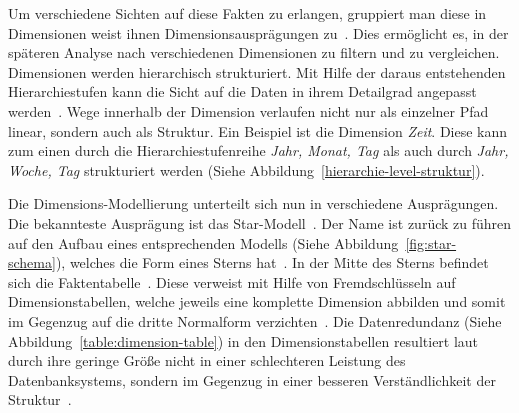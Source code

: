\documentclass[
  language=german, %
  type=bachelor%
]{isthesis}
\begin{document}
\begin{content}
  Um verschiedene Sichten auf diese Fakten zu erlangen, gruppiert man diese in
  Dimensionen \bzw{} weist ihnen Dimensionsausprägungen zu~\cite[][S.
  66]{Kemper2010}. Dies ermöglicht es, in der späteren Analyse nach
  verschiedenen Dimensionen zu filtern und zu vergleichen. Dimensionen werden
  hierarchisch strukturiert. Mit Hilfe der daraus entstehenden Hierarchiestufen
  kann die Sicht auf die Daten in ihrem Detailgrad angepasst werden~\cite[][S.
  66]{Kemper2010}. Wege innerhalb der Dimension verlaufen nicht nur als
  einzelner Pfad linear, sondern auch als Struktur. Ein Beispiel ist die
  Dimension \textit{Zeit}.  Diese kann zum einen durch die
  Hierarchiestufenreihe \textit{Jahr, Monat, Tag} als auch durch \textit{Jahr,
  Woche, Tag} strukturiert werden (Siehe
  Abbildung~\ref{hierarchie-level-struktur}).

  \begin{figure}[caption={Dimensionslevelstrukturbeispiel---Zeit}, label={hierarchie-level-struktur}]
    \resizebox{100pt}{!}{}
  \end{figure}

  Die Dimensions-Modellierung unterteilt sich nun in verschiedene Ausprägungen.
  Die bekannteste Ausprägung ist das Star-Modell~\cite[][S.
  2]{phipps2002automating}. Der Name ist zurück zu f\"uhren auf den Aufbau
  eines entsprechenden Modells (Siehe Abbildung~\ref{fig:star-schema}), welches
  die Form eines Sterns hat~\cite[][S.  44]{Kimball2013}. In der Mitte des
  Sterns befindet sich die Faktentabelle~\cite[][S. 67]{Kemper2010}. Diese
  verweist mit Hilfe von Fremdschlüsseln auf Dimensionstabellen, welche jeweils
  eine komplette Dimension abbilden und somit im Gegenzug auf die dritte
  Normalform verzichten~\cite[][S. 67 f.]{Kemper2010}. Die
  Datenredundanz (Siehe Abbildung~\ref{table:dimension-table}) in den
  Dimensionstabellen resultiert laut \textsc{\citeauthor{Kimball2013}} durch
  ihre geringe Größe nicht in einer schlechteren Leistung des Datenbanksystems,
  sondern im Gegenzug in einer besseren Verständlichkeit der
  Struktur~\cite[][S. 15]{Kimball2013}.

  \begin{figure}[caption={Star-Schema Beispielmodell angelehnt an~\cite{Kemper2010} Abb. 2.30}, label={fig:star-schema}]
    \resizebox{\columnwidth-90pt}{!}{}
  \end{figure}


\end{content}
\end{document}
